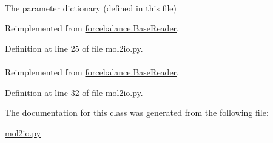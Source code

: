 \hypertarget{classforcebalance_1_1mol2io_1_1Mol2__Reader_a1948bbad4e6af3fc584838436f42daaf}{
\paragraph[{pdict}]{}}\label{classforcebalance_1_1mol2io_1_1Mol2__Reader_a1948bbad4e6af3fc584838436f42daaf}


\-The parameter dictionary (defined in this file) 



\-Reimplemented from \hyperlink{classforcebalance_1_1BaseReader_aaf18c900d6055ed4b5124f6bb26164c1}{forcebalance.\-Base\-Reader}.



\-Definition at line 25 of file mol2io.\-py.

\hypertarget{classforcebalance_1_1mol2io_1_1Mol2__Reader_a39adb792b05aab536e3376ecf2ec5778}{
\paragraph[{suffix}]{}}\label{classforcebalance_1_1mol2io_1_1Mol2__Reader_a39adb792b05aab536e3376ecf2ec5778}


\-Reimplemented from \hyperlink{classforcebalance_1_1BaseReader_a48ef0584a1b6b4b6f8eb741ad8465db8}{forcebalance.\-Base\-Reader}.



\-Definition at line 32 of file mol2io.\-py.



\-The documentation for this class was generated from the following file\-:\begin{DoxyCompactItemize}
\item 
\hyperlink{mol2io_8py}{mol2io.\-py}\end{DoxyCompactItemize}
